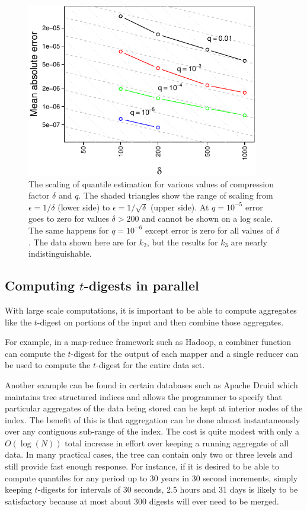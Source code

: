 \documentclass[11pt]{amsart}
\begin{document}
\begin{figure}[htb] %
   \centering
   \includegraphics[width=4in]{error-vs-compression.pdf} 
   \caption{The scaling of quantile estimation for various values of compression factor $\delta$ and $q$. 
   The shaded triangles show the range of scaling from $\epsilon = 1/\delta$ (lower side) to $\epsilon = 1/\sqrt{\delta}$ (upper side). 
   At $q=10^{-5}$ error goes to zero for values $\delta > 200$ and cannot be shown on a log scale. The same happens for $q=10^{-6}$ except error is zero for all values of $\delta$. The data shown here are for $k_2$, but the results for $k_3$ are nearly indistinguishable.}
   \label{fig:accuracy-scaling}
\end{figure}

\subsection{Computing $t$-digests in parallel}
With large scale computations, it is important to be able to compute aggregates like the $t$-digest on portions of the input and then combine those aggregates.  

For example, in a map-reduce framework such as Hadoop, a combiner function can compute the $t$-digest for the output of each mapper and a single reducer can be used to compute the $t$-digest for the entire data set.  

Another example can be found in certain databases such as Apache Druid which maintains tree structured indices and allows the programmer to specify that particular aggregates of the data being stored can be kept at interior nodes of the index.  The benefit of this is that aggregation can be done almost instantaneously over any contiguous sub-range of the index.  The cost is quite modest with only a $O(\log(N))$ total increase in effort over keeping a running aggregate of all data.  In many practical cases, the tree can contain only two or three levels and still provide fast enough response.  For instance, if it is desired to be able to compute quantiles for any period up to 30 years in 30 second increments, simply keeping $t$-digests for intervals of 30 seconds, 2.5 hours and 31 days is likely to be satisfactory because at most about 300 digests will ever need to be merged.  
\end{document}
